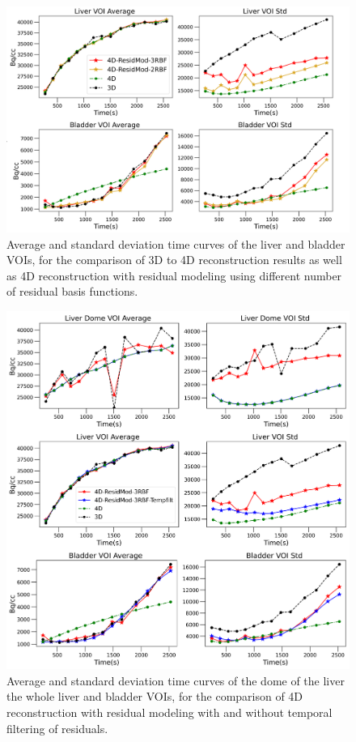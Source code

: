 \begin{figure} [h!]
\centering
\includegraphics[scale=0.64,angle=0]{3_Results/3_4_Residual/figures/TACs.png}
\caption{Average and standard deviation time curves of the liver and bladder VOIs, for the comparison of 3D to 4D reconstruction results as well as 4D reconstruction with residual modeling using different number of residual basis functions.} 
\label{fig:TACs}
\end{figure}

\begin{figure} [h!]
\centering
\includegraphics[scale=0.74 ,angle=0]{3_Results/3_4_Residual/figures/TACsFilt.png}
\caption{Average and standard deviation time curves of the dome of the liver the whole liver and bladder VOIs, for the comparison of 4D reconstruction with residual modeling with and without temporal filtering of residuals.} 
\label{fig:TACsFilt}
\end{figure}


